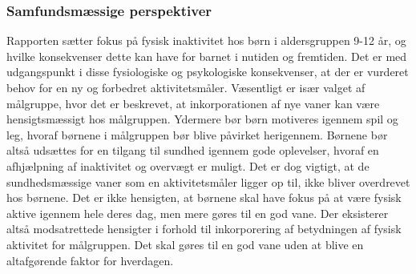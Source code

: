 \subsubsection{Samfundsmæssige perspektiver}
Rapporten sætter fokus på fysisk inaktivitet hos børn i aldersgruppen 9-12 år, og hvilke konsekvenser dette kan have for barnet i nutiden og fremtiden. Det er med udgangspunkt i disse fysiologiske og psykologiske konsekvenser, at der er vurderet behov for en ny og forbedret aktivitetsmåler. Væsentligt er især valget af målgruppe, hvor det er beskrevet, at inkorporationen af nye vaner kan være hensigtsmæssigt hos målgruppen. Ydermere bør børn motiveres igennem spil og leg, hvoraf børnene i målgruppen bør blive påvirket herigennem. Børnene bør altså udsættes for en tilgang til sundhed igennem gode oplevelser, hvoraf en afhjælpning af inaktivitet og overvægt er muligt. Det er dog vigtigt, at de sundhedsmæssige vaner som en aktivitetsmåler ligger op til, ikke bliver overdrevet hos børnene. Det er ikke hensigten, at børnene skal have fokus på at være fysisk aktive igennem hele deres dag, men mere gøres til en god vane. Der eksisterer altså modsatrettede hensigter i forhold til inkorporering af betydningen af fysisk aktivitet for målgruppen. Det skal gøres til en god vane uden at blive en altafgørende faktor for hverdagen.